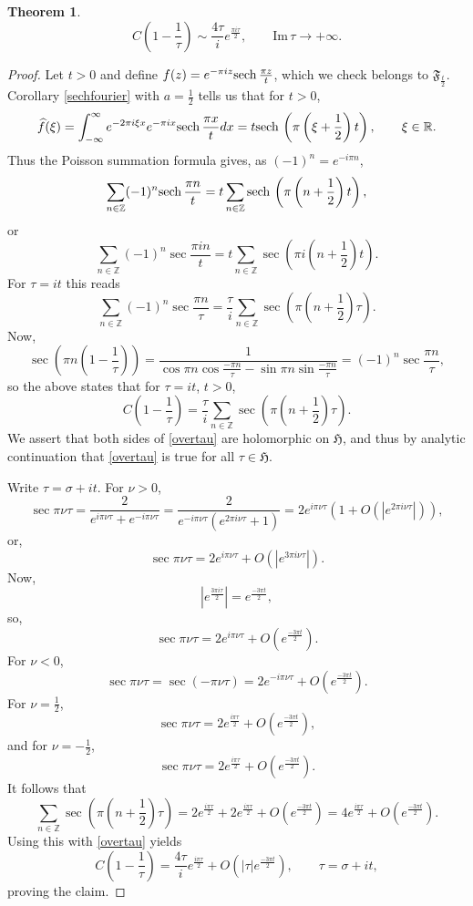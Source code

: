 \documentclass{article}
\def\Im{\ensuremath{\mathrm{Im}}\,}
\newcommand{\sech}{\ensuremath\mathrm{sech}\,}
\newtheorem{theorem}{Theorem}
\theoremstyle{definition}
\begin{document}
\begin{theorem}
\[
C\left(1-\frac{1}{\tau}\right) \sim \frac{4\tau}{i} e^{\frac{\pi i \tau}{2}}, \qquad \Im \tau \to +\infty.
\]
\end{theorem}
\begin{proof}
Let $t>0$ and define $f(z)=e^{-\pi iz} \sech \frac{\pi z}{t}$, which we check belongs to $\mathfrak{F}_{\frac{t}{2}}$. 
Corollary \ref{sechfourier} with $a=\frac{1}{2}$ tells us that for $t>0$,
\[
\widehat{f}(\xi)=\int_{-\infty}^\infty e^{-2\pi i\xi x} e^{-\pi ix} \sech \frac{\pi x}{t} dx = t \sech \left(\pi\left(\xi+\frac{1}{2} \right)t\right),
\qquad \xi \in \mathbb{R}.
\]
Thus the Poisson summation formula gives, as $(-1)^n = e^{-i\pi n}$,
\[
\sum_{n \in \mathbb{Z}} (-1)^n \sech \frac{\pi n}{t}
=t \sum_{n \in \mathbb{Z}} \sech\left(\pi\left(n+\frac{1}{2}\right)t\right),
\]
or
\[
\sum_{n \in \mathbb{Z}} (-1)^n \sec \frac{\pi i n}{t} = t \sum_{n \in \mathbb{Z}} \sec \left(\pi i \left(n+\frac{1}{2}\right) t\right).
\]
For $\tau=it$ this reads
\[
\sum_{n \in \mathbb{Z}} (-1)^n \sec \frac{\pi n}{\tau}
=\frac{\tau}{i} \sum_{n \in \mathbb{Z}} \sec \left(\pi\left(n+\frac{1}{2}\right) \tau\right).
\]
Now,
\[
\sec \left(\pi n \left(1-\frac{1}{\tau}\right)\right) = 
\frac{1}{\cos \pi n \cos \frac{-\pi n}{\tau}
-\sin \pi n \sin \frac{-\pi n}{\tau}}
=(-1)^n \sec \frac{\pi n}{\tau},
\]
so the above states that for $\tau=it$, $t>0$,
\begin{equation}
C\left(1-\frac{1}{\tau}\right)=
\frac{\tau}{i} \sum_{n \in \mathbb{Z}} \sec \left(\pi\left(n+\frac{1}{2}\right) \tau\right).
\label{overtau}
\end{equation}
We assert that both sides of \eqref{overtau} are holomorphic on $\mathfrak{H}$, and thus by analytic continuation that \eqref{overtau} is true for all
$\tau \in \mathfrak{H}$.

Write $\tau=\sigma+it$.
For $\nu>0$,
\[
\sec \pi \nu \tau =
\frac{2}{e^{i\pi \nu \tau}+e^{-i\pi \nu \tau}}
=\frac{2}{e^{-i\pi \nu \tau}(e^{2\pi i\nu \tau}+1)}
=2e^{i\pi \nu \tau}(1+O(|e^{2\pi i\nu \tau}|)),
\]
or,
\[
\sec \pi \nu \tau = 2e^{i\pi \nu \tau} + O(|e^{3\pi i\nu \tau}|).
\]
Now, 
\[
|e^{\frac{3\pi i \tau}{2}}| = e^{\frac{-3\pi t}{2}},
\]
so,
\[
\sec \pi \nu \tau = 2e^{i\pi \nu \tau} + O(e^{\frac{-3\pi t}{2}}).
\]
For $\nu<0$,
\[
\sec \pi \nu \tau = \sec (-\pi \nu \tau)
=2e^{- i\pi \nu \tau} + O(e^{\frac{-3\pi t}{2}}).
\]
For $\nu=\frac{1}{2}$,
\[
\sec \pi \nu \tau = 2e^{\frac{i\pi  \tau}{2}} + O(e^{\frac{-3\pi t}{2}}),
\]
and for $\nu=-\frac{1}{2}$,
\[
\sec \pi \nu \tau  = 2e^{\frac{i\pi  \tau}{2}} + O(e^{\frac{-3\pi t}{2}}).
\]
It follows that
\[
 \sum_{n \in \mathbb{Z}} \sec \left(\pi\left(n+\frac{1}{2}\right) \tau\right)
 =2e^{\frac{i\pi  \tau}{2}}+2e^{\frac{i\pi  \tau}{2}} + O(e^{\frac{-3\pi t}{2}})
 =4e^{\frac{i\pi  \tau}{2}} + O(e^{\frac{-3\pi t}{2}}).
\]
Using this with \eqref{overtau} yields
\[
C\left(1-\frac{1}{\tau}\right)=\frac{4\tau}{i}e^{\frac{i\pi  \tau}{2}} +
O(|\tau|e^{\frac{-3\pi t}{2}}),
\qquad \tau = \sigma+it,
\]
proving the claim.
\end{proof}
\end{document}
